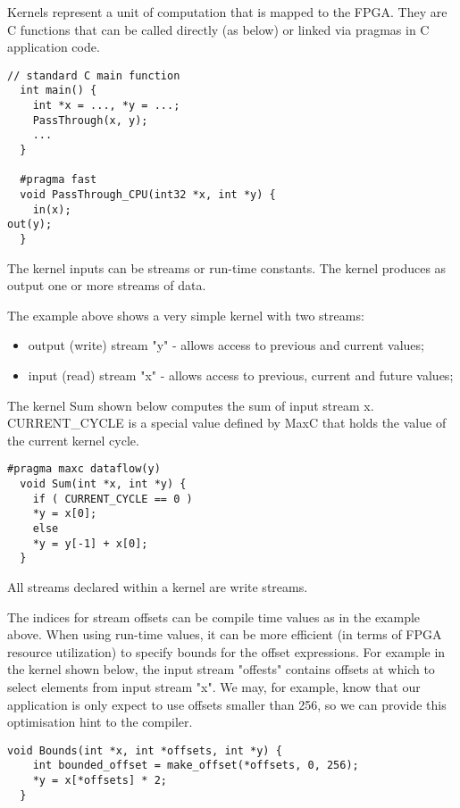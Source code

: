 Kernels represent a unit of computation that is mapped to the FPGA.
They are C functions that can be called directly (as below) or linked
via pragmas in C application code.

\begin{lstlisting}[caption={Simple \FAST{} dataflow kernel.}]
  // standard C main function
  int main() {
    int *x = ..., *y = ...;
    PassThrough(x, y);
    ...
  }

  #pragma fast
  void PassThrough_CPU(int32 *x, int *y) {
    in(x);
out(y);
  }
\end{lstlisting}

The kernel inputs can be streams or run-time constants. The kernel
produces as output one or more streams of data.

The example above shows a very simple kernel with two streams:

\begin{itemize}
\item output (write) stream "y" - allows access to previous and current values;
\item input (read) stream "x" - allows access to previous, current and future values;
\end{itemize}

The kernel Sum shown below computes the sum of input stream
x. CURRENT\_CYCLE is a special value defined by MaxC that holds the
value of the current kernel cycle.

\begin{lstlisting}[caption={\FAST{} kernel computing the sum of an input stream.}]
  #pragma maxc dataflow(y)
  void Sum(int *x, int *y) {
    if ( CURRENT_CYCLE == 0 )
    *y = x[0];
    else
    *y = y[-1] + x[0];
  }
\end{lstlisting}

All streams declared within a kernel are write streams.

The indices for stream offsets can be compile time values as in the
example above. When using run-time values, it can be more efficient
(in terms of FPGA resource utilization) to specify bounds for the
offset expressions. For example in the kernel shown below, the input
stream "offests" contains offsets at which to select elements from
input stream "x". We may, for example, know that our application is
only expect to use offsets smaller than 256, so we can provide this
optimisation hint to the compiler.

\begin{lstlisting}[caption={\FAST{} kernel using offsets.}]
  void Bounds(int *x, int *offsets, int *y) {
    int bounded_offset = make_offset(*offsets, 0, 256);
    *y = x[*offsets] * 2;
  }
\end{lstlisting}

